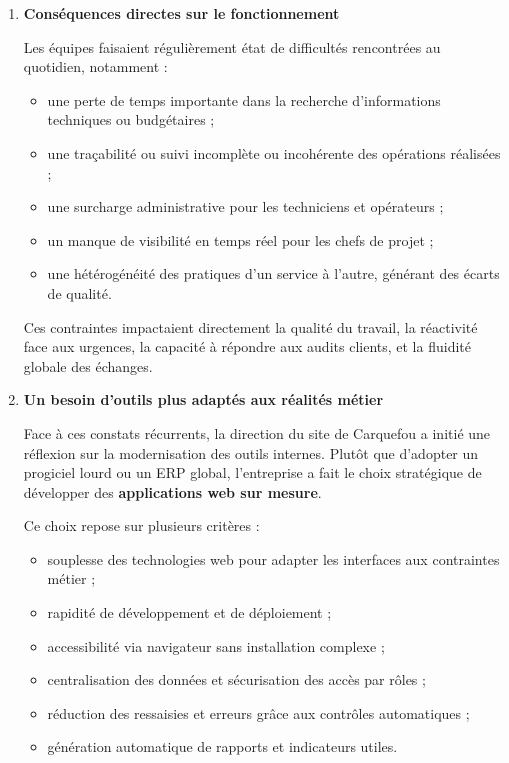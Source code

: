 \documentclass[11pt,a4paper]{article}
\begin{document}
\begin{enumerate}
\item \textbf{Conséquences directes sur le fonctionnement}

Les équipes faisaient régulièrement état de difficultés rencontrées au quotidien, notamment :

\begin{itemize}
    \item une perte de temps importante dans la recherche d’informations techniques ou budgétaires ;
    \item une traçabilité ou suivi incomplète ou incohérente des opérations réalisées ;
    \item une surcharge administrative pour les techniciens et opérateurs ;
    \item un manque de visibilité en temps réel pour les chefs de projet ;
    \item une hétérogénéité des pratiques d’un service à l’autre, générant des écarts de qualité.
\end{itemize}

Ces contraintes impactaient directement la qualité du travail, la réactivité face aux urgences, la capacité à répondre aux audits clients, et la fluidité globale des échanges.

\item \textbf{Un besoin d’outils plus adaptés aux réalités métier}

Face à ces constats récurrents, la direction du site de Carquefou a initié une réflexion sur la modernisation des outils internes. Plutôt que d’adopter un progiciel lourd ou un ERP global, l’entreprise a fait le choix stratégique de développer des \textbf{applications web sur mesure}.

\newpage
Ce choix repose sur plusieurs critères :

\begin{itemize}
    \item souplesse des technologies web pour adapter les interfaces aux contraintes métier ;
    \item rapidité de développement et de déploiement ;
    \item accessibilité via navigateur sans installation complexe ;
    \item centralisation des données et sécurisation des accès par rôles ;
    \item réduction des ressaisies et erreurs grâce aux contrôles automatiques ;
    \item génération automatique de rapports et indicateurs utiles.
\end{itemize}


\end{enumerate}
\end{document}
